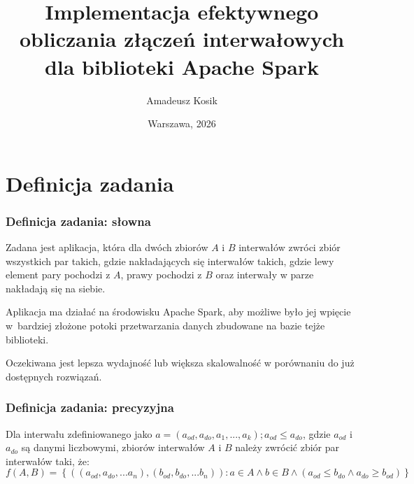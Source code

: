 \documentclass[aspectratio=169]{beamer}
\author[Amadeusz Kosik]{Amadeusz Kosik}
\title[Interwalled \insertframenumber/\inserttotalframenumber]{Implementacja efektywnego obliczania złączeń interwałowych \\ dla biblioteki Apache Spark}
\date{Warszawa, 2026}
\institute{Promotor pracy: \\ dr hab. inż. Tomasz Gambin, profesor uczelni}
\begin{document}
\frame{\titlepage}


\section{Definicja zadania}
	\begin{frame} 
		\frametitle{Definicja zadania: słowna}
		\parbox{\linewidth}{Zadana jest aplikacja, która dla dwóch zbiorów $A$ i $B$ interwałów zwróci zbiór wszystkich par takich, gdzie nakładających 
		się interwałów takich, gdzie lewy element pary pochodzi z $A$, prawy pochodzi z $B$ oraz interwały w parze nakładają się na siebie.}
		\vfill
		\parbox{\linewidth}{Aplikacja ma działać na środowisku Apache Spark, aby możliwe było jej wpięcie w~bardziej złożone potoki przetwarzania danych
		zbudowane na bazie tejże biblioteki.}
		\vfill
		\parbox{\linewidth}{Oczekiwana jest lepsza wydajność lub większa skalowalność w porównaniu do już dostępnych rozwiązań.}
	\end{frame}
	
	\begin{frame} 
		\frametitle{Definicja zadania: precyzyjna}
		Dla interwału zdefiniowanego jako $a = (a_{od}, a_{do}, a_1, ..., a_k); a_{od} \leq a_{do}$, gdzie $a_{od}$ i $a_{do}$ są danymi liczbowymi, 
		zbiorów interwałów $A$ i $B$ należy zwrócić zbiór par interwałów taki, że: 
		\begin{equation*}
			 f(A, B) = \left\lbrace \left(\left(a_{od}, a_{do}, ... a_n\right), \left(b_{od}, b_{do}, ... b_n\right)\right):
			 a \in A \land b \in B \land \left( a_{od} \leq b_{do} \land a_{do} \geq b_{od} \right) \right\rbrace
		\end{equation*}
	\end{frame}
	
\end{document}
